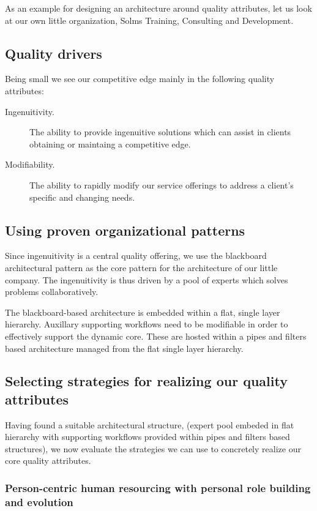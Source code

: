 \documentclass[11pt,english,a4]{article}
\begin{document}
As an example for designing an architecture around quality attributes, let us look at our own little organization, Solms Training, Consulting and Development.

\subsection{Quality drivers}

Being small we see our competitive edge mainly in the following quality attributes: 
\begin{description}
  \item[Ingenuitivity.] The ability to provide ingenuitive solutions which can assist in clients obtaining or maintaing a competitive edge.
  \item[Modifiability.] The ability to rapidly modify our service offerings to address a client's specific and changing needs.
\end{description}

\subsection{Using proven organizational patterns}

Since ingenuitivity is a central quality offering, we use the blackboard architectural pattern as the core pattern for the architecture of our little company. The ingenuitivity is thus driven by a pool of experts which solves problems collaboratively.

The blackboard-based architecture is embedded within a flat, single layer hierarchy. Auxillary supporting workflows need to be modifiable in order to effectively support the dynamic core. These are hosted within a pipes and filters based architecture managed from the flat single layer hierarchy.

\subsection{Selecting strategies for realizing our quality attributes}

Having found a suitable architectural structure, (expert pool embeded in flat hierarchy with supporting workflows provided within pipes and filters based structures), we now evaluate the strategies we can use to concretely realize our core quality attributes.

\subsubsection{Person-centric human resourcing with personal role building and evolution}
\end{document}
